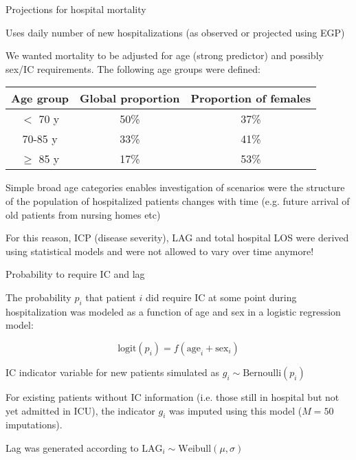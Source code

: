 \documentclass[t,9pt,xcolor=dvipsnames]{beamer}              %
\begin{document}
\begin{frame}{Projections for hospital mortality}
\justifying

Uses daily number of new hospitalizations (as observed or projected using EGP)

We wanted mortality to be adjusted for age (strong predictor) and possibly sex/IC requirements. The following age groups were defined:
\medskip
\begin{table}[ht]
\centering
 \begin{tabular}{|c|c|c|} \hline
 Age group & Global proportion & Proportion of females \\
 \hline
 $<$ 70 y & 50\% & 37\% \\
 70-85 y & 33\% & 41\% \\
 $\geq$ 85 y & 17\% & 53\%\\
 \hline
 \end{tabular}
 \end{table}
 \medskip
 
Simple broad age categories enables investigation of scenarios were the structure of the population of hospitalized patients changes with time (e.g. future arrival of old patients from nursing homes etc)

For this reason, ICP (disease severity), LAG and total hospital LOS were derived using statistical models and were not allowed to vary over time anymore!

\note{
\tiny
\justifying

}
\end{frame}

\begin{frame}{Probability to require IC and lag}
\justifying

The probability $p_{i}$ that patient $i$ did require IC at some point during hospitalization was modeled as a function of age and sex in a logistic regression model:

\begin{equation*}
\text{logit}(p_{i})=f(\text{age}_{i}+\text{sex}_{i})
\end{equation*}

IC indicator variable for new patients simulated as $g_{i} \sim \text{Bernoulli}(p_{i})$

For existing patients without IC information (i.e. those still in hospital but not yet admitted in ICU), the indicator $g_{i}$ was imputed  using this model ($M=50$ imputations).

Lag was generated according to $\text{LAG}_{i} \sim \text{Weibull}(\mu,\sigma)$

\note{
\tiny
\justifying

}
\end{frame}
\end{document}
